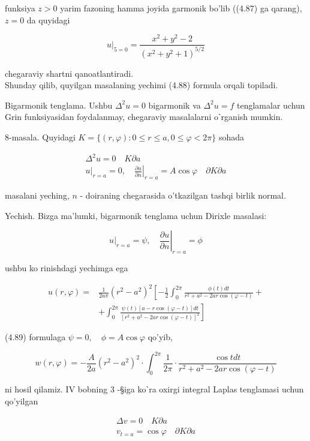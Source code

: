 \documentclass[10pt]{article}
\begin{document}
funksiya $z>0$ yarim fazoning hamma joyida garmonik bo'lib ((4.87) ga qarang), $z=0$ da quyidagi

$$
\left.u\right|_{5=0}=\frac{x^{2}+y^{2}-2}{\left(x^{2}+y^{2}+1\right)^{5 / 2}}
$$

chegaraviy shartni qanoatlantiradi.\\
Shunday qilib, quyilgan masalaning yechimi (4.88) formula orqali topiladi.

Bigarmonik tenglama. Ushbu $\Delta^{2} u=0$ bigarmonik va $\Delta^{2} u=f$ tenglamalar uchun Grin funksiyasidan foydalanmay, chegaraviy masalalarni oˋrganish mumkin.

8-masala. Quyidagi $K=\{(r, \varphi): 0 \leq r \leq a, 0 \leq \varphi<2 \pi\}$ sohada

$$
\begin{gathered}
\Delta^{2} u=0 \quad K \partial a \\
\left.u\right|_{r=a}=0,\left.\quad \frac{\partial u}{\partial n}\right|_{r=a}=A \cos \varphi \quad \partial K \partial a
\end{gathered}
$$

masalani yeching, $n$ - doiraning chegarasida o'tkazilgan tashqi birlik normal.

Yechish. Bizga ma'lumki, bigarmonik tenglama uchun Dirixle masalasi:

$$
\left.u\right|_{r=a}=\psi,\left.\quad \frac{\partial u}{\partial n}\right|_{r=a}=\phi
$$

ushbu ko rinishdagi yechimga ega


\begin{align*}
u(r, \varphi)= & \frac{1}{2 a \pi}\left(r^{2}-a^{2}\right)^{2}\left[-\frac{1}{2} \int_{0}^{2 \pi} \frac{\phi(t) d t}{r^{2}+a^{2}-2 a r \cos (\varphi-t)}+\right. \\
& \left.+\int_{0}^{2 \pi} \frac{\psi(t)[a-r \cos (\varphi-t)] d t}{\left[r^{2}+a^{2}-2 a r \cos (\varphi-t)\right]^{2}}\right] \tag{4.89}
\end{align*}


(4.89) formulaga $\psi=0, \quad \phi=A \cos \varphi$ qo'yib,

$$
w(r, \varphi)=-\frac{A}{2 a}\left(r^{2}-a^{2}\right)^{2} \cdot \int_{0}^{2 \pi} \frac{1}{2 \pi} \cdot \frac{\cos t d t}{r^{2}+a^{2}-2 a r \cos (\varphi-t)}
$$

ni hosil qilamiz. IV bobning 3 -§iga koˋra oxirgi integral Laplas tenglamasi uchun qo'yilgan

$$
\begin{gathered}
\Delta v=0 \quad K \partial a \\
v_{t=a}=\cos \varphi \quad \partial K \partial a
\end{gathered}
$$
\end{document}
